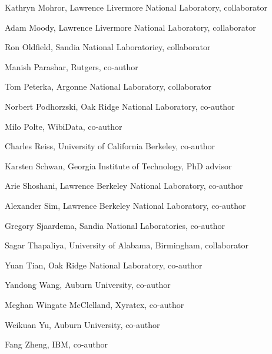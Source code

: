   \item Kathryn Mohror, Lawrence Livermore National Laboratory, collaborator
  \item Adam Moody, Lawrence Livermore National Laboratory, collaborator
  \item Ron Oldfield, Sandia National Laboratoriey, collaborator
  \item Manish Parashar, Rutgers, co-author
  \item Tom Peterka, Argonne National Laboratory, collaborator
  \item Norbert Podhorzski, Oak Ridge National Laboratory, co-author
  \item Milo Polte, WibiData, co-author
  \item Charles Reiss, University of California Berkeley, co-author
  \item Karsten Schwan, Georgia Institute of Technology, PhD advisor
  \item Arie Shoshani, Lawrence Berkeley National Laboratory, co-author
  \item Alexander Sim, Lawrence Berkeley National Laboratory, co-author
  \item Gregory Sjaardema, Sandia National Laboratories, co-author
  \item Sagar Thapaliya, University of Alabama, Birmingham, collaborator
  \item Yuan Tian, Oak Ridge National Laboratory, co-author
  \item Yandong Wang, Auburn University, co-author
  \item Meghan Wingate McClelland, Xyratex, co-author
  \item Weikuan Yu, Auburn University, co-author
  \item Fang Zheng, IBM, co-author
